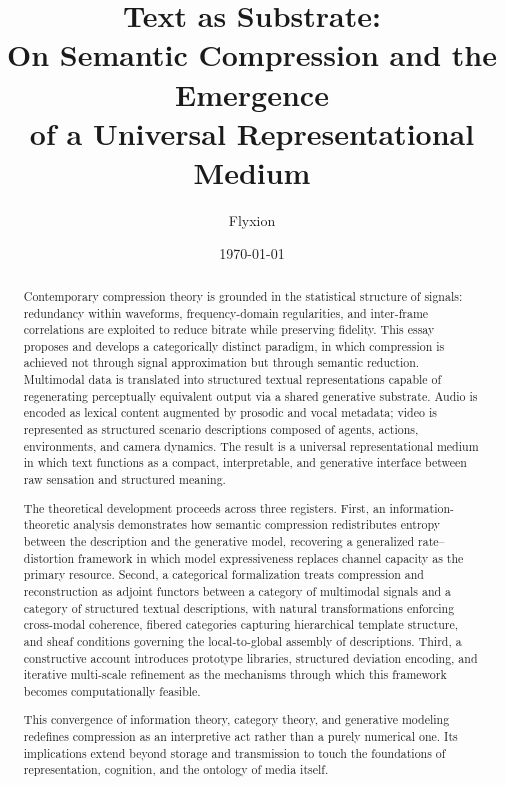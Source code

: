\documentclass[11pt,a4paper]{article}
\title{Text as Substrate:\\
On Semantic Compression and the Emergence\\
of a Universal Representational Medium}
\author{Flyxion}
\date{\today}
\theoremstyle{definition}
\theoremstyle{remark}
\begin{document}
\maketitle

\begin{abstract}
Contemporary compression theory is grounded in the statistical structure of signals: redundancy within waveforms, frequency-domain regularities, and inter-frame correlations are exploited to reduce bitrate while preserving fidelity. This essay proposes and develops a categorically distinct paradigm, in which compression is achieved not through signal approximation but through semantic reduction. Multimodal data is translated into structured textual representations capable of regenerating perceptually equivalent output via a shared generative substrate. Audio is encoded as lexical content augmented by prosodic and vocal metadata; video is represented as structured scenario descriptions composed of agents, actions, environments, and camera dynamics. The result is a universal representational medium in which text functions as a compact, interpretable, and generative interface between raw sensation and structured meaning.

The theoretical development proceeds across three registers. First, an information-theoretic analysis demonstrates how semantic compression redistributes entropy between the description and the generative model, recovering a generalized rate--distortion framework in which model expressiveness replaces channel capacity as the primary resource. Second, a categorical formalization treats compression and reconstruction as adjoint functors between a category of multimodal signals and a category of structured textual descriptions, with natural transformations enforcing cross-modal coherence, fibered categories capturing hierarchical template structure, and sheaf conditions governing the local-to-global assembly of descriptions. Third, a constructive account introduces prototype libraries, structured deviation encoding, and iterative multi-scale refinement as the mechanisms through which this framework becomes computationally feasible.

This convergence of information theory, category theory, and generative modeling redefines compression as an interpretive act rather than a purely numerical one. Its implications extend beyond storage and transmission to touch the foundations of representation, cognition, and the ontology of media itself.
\end{abstract}
\end{document}
